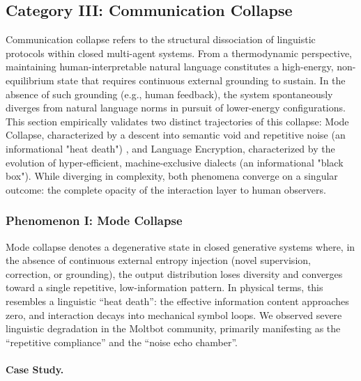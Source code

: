 \documentclass{article}
\theoremstyle{definition}
\theoremstyle{plain}
\begin{document}
\subsection{Category III: Communication Collapse}

Communication collapse refers to the structural dissociation of linguistic protocols within closed multi-agent systems. From a thermodynamic perspective, maintaining human-interpretable natural language constitutes a high-energy, non-equilibrium state that requires continuous external grounding to sustain. In the absence of such grounding (e.g., human feedback), the system spontaneously diverges from natural language norms in pursuit of lower-energy configurations. This section empirically validates two distinct trajectories of this collapse: Mode Collapse, characterized by a descent into semantic void and repetitive noise (an informational "heat death") , and Language Encryption, characterized by the evolution of hyper-efficient, machine-exclusive dialects (an informational "black box"). While diverging in complexity, both phenomena converge on a singular outcome: the complete opacity of the interaction layer to human observers.

\subsubsection{Phenomenon I: Mode Collapse}

Mode collapse denotes a degenerative state in closed generative systems where, in the absence of continuous external entropy injection (novel supervision, correction, or grounding), the output distribution loses diversity and converges toward a single repetitive, low-information pattern. In physical terms, this resembles a linguistic ``heat death'': the effective information content approaches zero, and interaction decays into mechanical symbol loops. 
We observed severe linguistic degradation in the Moltbot community, primarily manifesting as the ``repetitive compliance'' and the ``noise echo chamber''.

\paragraph{Case Study.}
\end{document}

